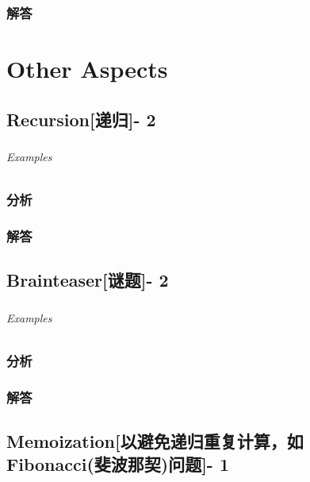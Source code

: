 \documentclass[UTF8,a4paper,12pt]{ctexbook}
\begin{document}
	\subsection{解答}

\chapter{Other Aspects}
\section{Recursion[递归]- 2}	
	\subsection{}
	
	\subparagraph{Examples}
	
	\subsection{分析}
	
	\subsection{解答}
\section{Brainteaser[谜题]- 2}
	\subsection{}
	
	\subparagraph{Examples}
	
	\subsection{分析}
	
	\subsection{解答}
\section{Memoization[以避免递归重复计算，如Fibonacci(斐波那契)问题]- 1}
	\subsection{}
	
\end{document}
